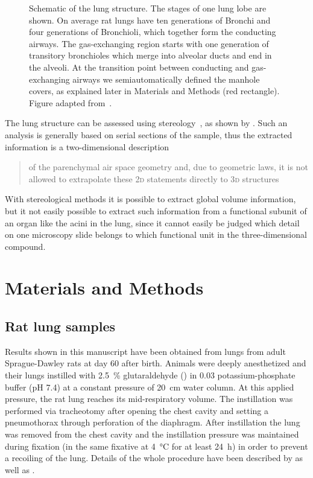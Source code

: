 \documentclass[%
	paper=a4,%
	abstract=true,%
	]{scrartcl}
\newlength\imagescale		%
\newcommand{\twod}{2\textsc{d}\xspace}
\newcommand{\threed}{3\textsc{d}\xspace}
\begin{document}
\begin{figure}
%
	\caption{Schematic of the lung structure. The stages of one lung lobe are shown. On average rat lungs have ten generations of Bronchi and four generations of Bronchioli, which together form the conducting airways. The gas-exchanging region starts with one generation of transitory bronchioles which merge into alveolar ducts and end in the alveoli. At the transition point between conducting and gas-exchanging airways we semiautomatically defined the manhole covers, as explained later in Materials and Methods (red rectangle). Figure adapted from~\cite{Schittny2007a}.}
	\label{fig:lung schematic}%
\end{figure}

The lung structure can be assessed using stereology~\cite{Hsia2010}, as shown by \citet{Tschanz2002}. Such an analysis is generally based on serial sections of the sample, thus the extracted information is a two-dimensional description \blockquote[\cite{Tschanz2002}]{of the parenchymal air space geometry and, due to geometric laws, it is not allowed to extrapolate these \twod statements directly to \threed structures}. With stereological methods it is possible to extract global volume information, but it not easily possible to extract such information from a functional subunit of an organ like the acini in the lung, since it cannot easily be judged which detail on one microscopy slide belongs to which functional unit in the three-dimensional compound.

\section{Materials and Methods\label{sec:MM}}
\subsection{Rat lung samples}
Results shown in this manuscript have been obtained from lungs from adult Sprague-Dawley rats at day 60 after birth. Animals were deeply anesthetized and their lungs instilled with \SI{2.5}{\percent} glutaraldehyde () in \SI{0.03}{\Molar} potassium-phosphate buffer (pH 7.4) at a constant pressure of \SI{20}{\centi\meter} water column. At this applied pressure, the rat lung reaches its mid-respiratory volume. The instillation was performed via tracheotomy after opening the chest cavity and setting a pneumothorax through perforation of the diaphragm. After instillation the lung was removed from the chest cavity and the instillation pressure was maintained during fixation (in the same fixative at \SI{4}{\celsius} for at least \SI{24}{\hour}) in order to prevent a recoiling of the lung. Details of the whole procedure have been described by \citet{Tschanz2002} as well as \citet{Burri1974}.
\end{document}
